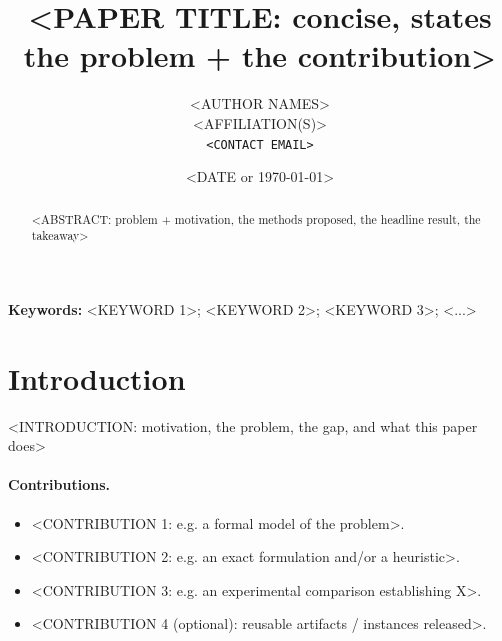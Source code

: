 \documentclass[11pt]{article}
\title{<PAPER TITLE: concise, states the problem + the contribution>}
\author{<AUTHOR NAMES>\\ <AFFILIATION(S)> \\ \texttt{<CONTACT EMAIL>}}
\date{<DATE or \today>}
\begin{document}
\maketitle

\begin{abstract}
<ABSTRACT: problem + motivation, the methods proposed, the headline result,
the takeaway>
\end{abstract}

\noindent\textbf{Keywords:} <KEYWORD 1>; <KEYWORD 2>; <KEYWORD 3>; <...>

\section{Introduction}
<INTRODUCTION: motivation, the problem, the gap, and what this paper does>

\paragraph{Contributions.}
\begin{itemize}
  \item <CONTRIBUTION 1: e.g. a formal model of the problem>.
  \item <CONTRIBUTION 2: e.g. an exact formulation and/or a heuristic>.
  \item <CONTRIBUTION 3: e.g. an experimental comparison establishing X>.
  \item <CONTRIBUTION 4 (optional): reusable artifacts / instances released>.
\end{itemize}
\end{document}
